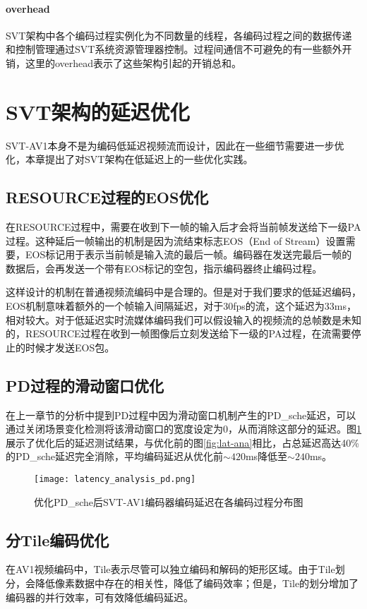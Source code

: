 \paragraph{overhead} SVT架构中各个编码过程实例化为不同数量的线程，各编码过程之间的数据传递和控制管理通过SVT系统资源管理器控制。过程间通信不可避免的有一些额外开销，这里的overhead表示了这些架构引起的开销总和。

\section{SVT架构的延迟优化}

SVT-AV1本身不是为编码低延迟视频流而设计，因此在一些细节需要进一步优化，本章提出了对SVT架构在低延迟上的一些优化实践。

\subsection{RESOURCE过程的EOS优化}
  在RESOURCE过程中，需要在收到下一帧的输入后才会将当前帧发送给下一级PA过程。这种延后一帧输出的机制是因为流结束标志EOS（End of Stream）设置需要，EOS标记用于表示当前帧是输入流的最后一帧。编码器在发送完最后一帧的数据后，会再发送一个带有EOS标记的空包，指示编码器终止编码过程。

  这样设计的机制在普通视频流编码中是合理的。但是对于我们要求的低延迟编码，EOS机制意味着额外的一个帧输入间隔延迟，对于30fps的流，这个延迟为33ms，相对较大。对于低延迟实时流媒体编码我们可以假设输入的视频流的总帧数是未知的，RESOURCE过程在收到一帧图像后立刻发送给下一级的PA过程，在流需要停止的时候才发送EOS包。

\subsection{PD过程的滑动窗口优化}
	在上一章节的分析中提到PD过程中因为滑动窗口机制产生的PD\_sche延迟，可以通过关闭场景变化检测将该滑动窗口的宽度设定为0，从而消除这部分的延迟。图\ref{fig:lat-ana-pd}展示了优化后的延迟测试结果，与优化前的图\ref{fig:lat-ana}相比，占总延迟高达40\%的PD\_sche延迟完全消除，平均编码延迟从优化前$\sim 420$ms降低至$\sim 240$ms。

	\begin{figure}[!htp]
		\centering
		\texttt{[image: latency\_analysis\_pd.png]}
		\caption{优化PD\_sche后SVT-AV1编码器编码延迟在各编码过程分布图}
		\label{fig:lat-ana-pd}
	\end{figure}

\subsection{分Tile编码优化}
	在AV1视频编码中，Tile\cite{fuldsethfuldsethTiles}表示尽管可以独立编码和解码的矩形区域。由于Tile划分，会降低像素数据中存在的相关性，降低了编码效率；但是，Tile的划分增加了编码器的并行效率，可有效降低编码延迟\cite{misraOverviewTilesHEVC2013}。

